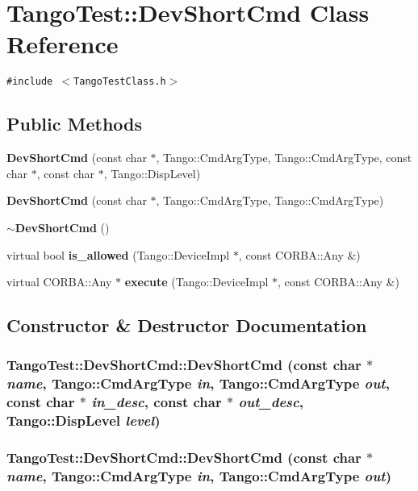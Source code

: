 \section{Tango\-Test::Dev\-Short\-Cmd  Class Reference}
\label{classTangoTest_1_1DevShortCmd}
{\tt \#include $<$Tango\-Test\-Class.h$>$}

\subsection*{Public Methods}
\begin{CompactItemize}
\item 
{\bf Dev\-Short\-Cmd} (const char $\ast$, Tango::Cmd\-Arg\-Type, Tango::Cmd\-Arg\-Type, const char $\ast$, const char $\ast$, Tango::Disp\-Level)
\item 
{\bf Dev\-Short\-Cmd} (const char $\ast$, Tango::Cmd\-Arg\-Type, Tango::Cmd\-Arg\-Type)
\item 
{\bf $\sim$Dev\-Short\-Cmd} ()
\item 
virtual bool {\bf is\_\-allowed} (Tango::Device\-Impl $\ast$, const CORBA::Any \&)
\item 
virtual CORBA::Any $\ast$ {\bf execute} (Tango::Device\-Impl $\ast$, const CORBA::Any \&)
\end{CompactItemize}


\subsection{Constructor \& Destructor Documentation}
\subsubsection{\setlength{\rightskip}{0pt plus 5cm}Tango\-Test::Dev\-Short\-Cmd::Dev\-Short\-Cmd (const char $\ast$ {\em name}, Tango::Cmd\-Arg\-Type {\em in}, Tango::Cmd\-Arg\-Type {\em out}, const char $\ast$ {\em in\_\-desc}, const char $\ast$ {\em out\_\-desc}, Tango::Disp\-Level {\em level})}\label{classTangoTest_1_1DevShortCmd_a0}


\subsubsection{\setlength{\rightskip}{0pt plus 5cm}Tango\-Test::Dev\-Short\-Cmd::Dev\-Short\-Cmd (const char $\ast$ {\em name}, Tango::Cmd\-Arg\-Type {\em in}, Tango::Cmd\-Arg\-Type {\em out})}\label{classTangoTest_1_1DevShortCmd_a1}


